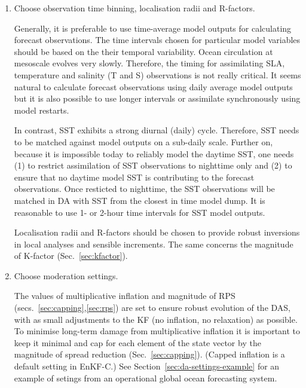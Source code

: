 \documentclass[11pt]{report}
\begin{document}
\begin{enumerate}
  In some cases the model can be substantially biased about MDT estimates.
  Thes biases project on subsurface state and can cause significant drifts and biases.
  In these cases it may be necessary to use the native MDT calculated as the average sea level during the initial hindcast.

\item{Choose observation time binning, localisation radii and R-factors.}

  Generally, it is preferable to use time-average model outputs for calculating forecast observations.
  The time intervals chosen for particular model variables should be based on the their temporal variability. 
  Ocean circulation at mesoscale evolves very slowly.
  Therefore, the timing for assimilating SLA, temperature and salinity (T and S) observations is not really critical.
  It seems natural to calculate forecast observations using daily average model outputs but it is also possible to use longer intervals or assimilate synchronously using model restarts.

  In contrast, SST exhibits a strong diurnal (daily) cycle.
  Therefore, SST needs to be matched against model outputs on a sub-daily scale.
  Further on, because it is impossible today to reliably model the daytime SST, one needs (1) to restrict assimilation of SST observations to nighttime only and (2) to ensure that no daytime model SST is contributing to the forecast observations.
  Once resticted to nighttime, the SST observations will be matched in DA with SST from the closest in time model dump.
  It is reasonable to use 1- or 2-hour time intervals for SST model outputs.

  Localisation radii and R-factors should be chosen to provide robust inversions in local analyses and sensible increments.
  The same concerns the magnitude of K-factor (Sec.~\ref{sec:kfactor}).

\item{Choose moderation settings.}

  The values of multiplicative inflation and magnitude of RPS (secs.~\ref{sec:capping},\ref{sec:rps}) are set to ensure robust evolution of the DAS, with as small adjustments to the KF (no inflation, no relaxation) as possible.
  To minimise long-term damage from multiplicative inflation it is important to keep it minimal and cap for each element of the state vector by the magnitude of spread reduction (Sec.~\ref{sec:capping}).
  (Capped inflation is a default setting in EnKF-C.)
  See Section~\ref{sec:da-settings-example} for an example of setings from an operational global ocean forecasting system.


\end{enumerate}
\end{document}
